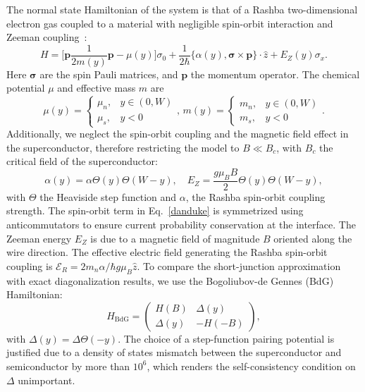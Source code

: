 \documentclass[twocolumn, notitlepage, 10pt, aps, floatfix, showpacs, prb, citeautoscript]{revtex4-1}
\newcommand{\comment}[1]{}
\begin{document}
\comment{We use Rashba 2DEG + BdG}
The normal state Hamiltonian of the system is that of a Rashba two-dimensional electron gas coupled to a material with negligible spin-orbit interaction and Zeeman coupling~\cite{BenDaniel1966}:
\begin{equation}\label{danduke}
H=\bigg[\bm p\frac{1}{2m(y)}\bm p-\mu(y)\bigg]\sigma_0
+\frac{1}{2\hbar}\{\alpha(y),\bm\sigma\times\bm p\}\cdot\hat z
+E_Z(y)\sigma_x.
\end{equation}
Here $\bm{\sigma}$ are the spin Pauli matrices, and $\bm p$ the momentum operator.
The chemical potential $\mu$ and effective mass $m$ are
\begin{equation}
\label{eq:potentials}
\mu(y)=
\begin{cases}
\mu_{n},& y \in(0,W)\\
\mu_s,& y < 0
\end{cases},\,
m(y)=
\begin{cases}
m_{n},& y \in(0,W) \\
m_s,& y < 0
\end{cases}.
\end{equation}
Additionally, we neglect the spin-orbit coupling and the magnetic field effect in the superconductor, therefore restricting the model to $B\ll B_c$, with $B_c$ the critical field of the superconductor:
\begin{equation}
\label{eq:spin_terms}
\alpha(y) = \alpha \Theta(y)\Theta(W-y),\quad E_Z = \frac{g\mu_B B}{2}\Theta(y)\Theta(W-y),
\end{equation}
with $\Theta$ the Heaviside step function and $\alpha$, the Rashba spin-orbit coupling strength.
The spin-orbit term in Eq.~\eqref{danduke} is symmetrized using anticommutators to ensure current probability conservation at the interface.
The Zeeman energy $E_Z$ is due to a magnetic field of magnitude $B$ oriented along the wire direction.
The effective electric field generating the Rashba spin-orbit coupling is $\bm{\mathcal E}_R= 2m_n\alpha /\hbar g\mu_B\hat z$.
To compare the short-junction approximation with exact diagonalization results, we use the Bogoliubov-de Gennes (BdG) Hamiltonian:
\begin{equation}\label{sc}
H_\textrm{BdG}=\begin{pmatrix}H(B) & \Delta(y) \\ \Delta(y) & -H(-B)\end{pmatrix},
\end{equation}
with $\Delta(y) = \Delta \Theta(-y)$.
The choice of a step-function pairing potential is justified due to a density of states mismatch between the superconductor and semiconductor by more than $10^6$, which renders the self-consistency condition on $\Delta$ unimportant.
\end{document}
